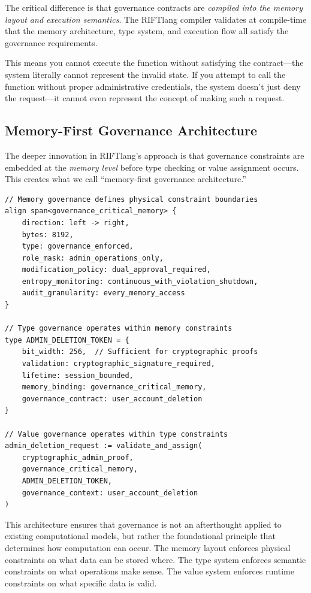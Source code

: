 The critical difference is that governance contracts are \textit{compiled into the memory layout and execution semantics}. The RIFTlang compiler validates at compile-time that the memory architecture, type system, and execution flow all satisfy the governance requirements. 

This means you cannot execute the function without satisfying the contract—the system literally cannot represent the invalid state. If you attempt to call the function without proper administrative credentials, the system doesn't just deny the request—it cannot even represent the concept of making such a request.

\subsection{Memory-First Governance Architecture}

The deeper innovation in RIFTlang's approach is that governance constraints are embedded at the \textit{memory level} before type checking or value assignment occurs. This creates what we call ``memory-first governance architecture.''

\begin{lstlisting}[language=rift, caption=Memory-First Governance Constraints]
// Memory governance defines physical constraint boundaries
align span<governance_critical_memory> {
    direction: left -> right,
    bytes: 8192,
    type: governance_enforced,
    role_mask: admin_operations_only,
    modification_policy: dual_approval_required,
    entropy_monitoring: continuous_with_violation_shutdown,
    audit_granularity: every_memory_access
}

// Type governance operates within memory constraints
type ADMIN_DELETION_TOKEN = {
    bit_width: 256,  // Sufficient for cryptographic proofs
    validation: cryptographic_signature_required,
    lifetime: session_bounded,
    memory_binding: governance_critical_memory,
    governance_contract: user_account_deletion
}

// Value governance operates within type constraints  
admin_deletion_request := validate_and_assign(
    cryptographic_admin_proof,
    governance_critical_memory,
    ADMIN_DELETION_TOKEN,
    governance_context: user_account_deletion
)
\end{lstlisting}

This architecture ensures that governance is not an afterthought applied to existing computational models, but rather the foundational principle that determines how computation can occur. The memory layout enforces physical constraints on what data can be stored where. The type system enforces semantic constraints on what operations make sense. The value system enforces runtime constraints on what specific data is valid.

